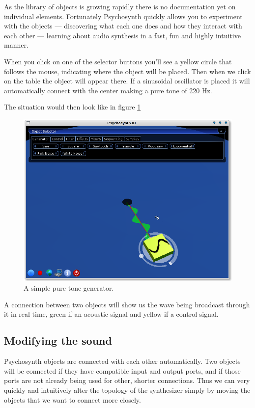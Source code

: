 As the library of objects is growing rapidly there is no documentation
yet on individual elements. Fortunately Psychosynth quickly allows you
to experiment with the objects --- discovering what each one does and
how they interact with each other --- learning about audio synthesis
in a fast, fun and highly intuitive manner.

When you click on one of the selector buttons you'll see a yellow
circle that follows the mouse, indicating where the object will be
placed. Then when we click on the table the object will appear
there. If a sinusoidal oscillator is placed it will automatically
connect with the center making a pure tone of 220 Hz.

The situation would then look like in figure \ref{fig:userman-1}

\begin{figure}[h!]
  \centering
  \includegraphics[width=.7\textwidth]{pic/userman-1.png}
  \caption{A simple pure tone generator.}
  \label{fig:userman-1}
\end{figure}

A connection between two objects will show us the wave being broadcast
through it in real time, green if an acoustic signal and yellow if a
control signal.

\subsection{Modifying the sound}

Psychosynth objects are connected with each other automatically. Two
objects will be connected if they have compatible input and output
ports, and if those ports are not already being used for other,
shorter connections. Thus we can very quickly and intuitively alter
the topology of the synthesizer simply by moving the objects that we
want to connect more closely.

